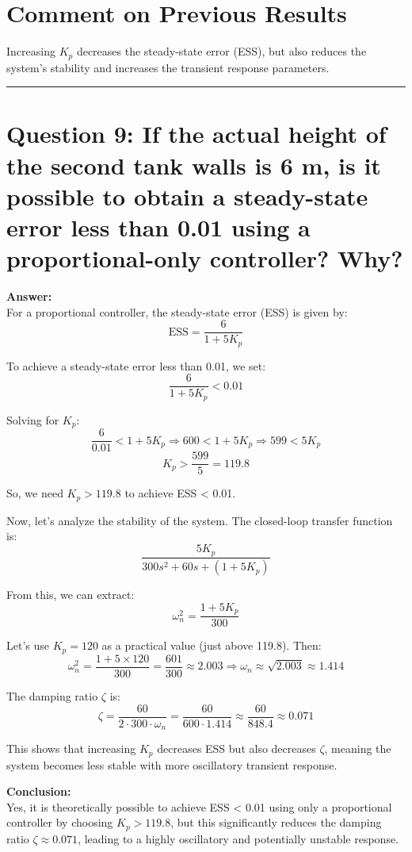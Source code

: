 \documentclass{report}
\begin{document}
\begin{flushleft}
\begin{figure}[H]
\end{figure}

\newpage
\section*{Comment on Previous Results}
Increasing \( K_p \) decreases the steady-state error (ESS), but also reduces the system's stability and increases the transient response parameters.

\noindent\rule{\linewidth}{0.4pt}

\section*{Question 9: If the actual height of the second tank walls is 6 m, is it possible to obtain a steady-state error less than 0.01 using a proportional-only controller? Why?}


\textbf{Answer:} \\

For a proportional controller, the steady-state error (ESS) is given by:
\[
\text{ESS} = \frac{6}{1 + 5K_p}
\]

To achieve a steady-state error less than 0.01, we set:
\[
\frac{6}{1 + 5K_p} < 0.01
\]

Solving for \( K_p \):
\[
\frac{6}{0.01} < 1 + 5K_p \Rightarrow 600 < 1 + 5K_p \Rightarrow 599 < 5K_p
\]
\[
K_p > \frac{599}{5} = 119.8
\]

So, we need \( K_p > 119.8 \) to achieve ESS < 0.01.

Now, let's analyze the stability of the system. The closed-loop transfer function is:
\[
\frac{5K_p}{300s^2 + 60s + (1 + 5K_p)}
\]

From this, we can extract:
\[
\omega_n^2 = \frac{1 + 5K_p}{300}
\]

Let’s use \( K_p = 120 \) as a practical value (just above 119.8). Then:
\[
\omega_n^2 = \frac{1 + 5 \times 120}{300} = \frac{601}{300} \approx 2.003 \Rightarrow \omega_n \approx \sqrt{2.003} \approx 1.414
\]

The damping ratio \( \zeta \) is:
\[
\zeta = \frac{60}{2 \cdot 300 \cdot \omega_n} = \frac{60}{600 \cdot 1.414} \approx \frac{60}{848.4} \approx 0.071
\]

This shows that increasing \( K_p \) decreases ESS but also decreases \( \zeta \), meaning the system becomes less stable with more oscillatory transient response.

\textbf{Conclusion:} \\
Yes, it is theoretically possible to achieve ESS < 0.01 using only a proportional controller by choosing \( K_p > 119.8 \), but this significantly reduces the damping ratio \( \zeta \approx 0.071 \), leading to a highly oscillatory and potentially unstable response.



\end{flushleft}
\end{document}
